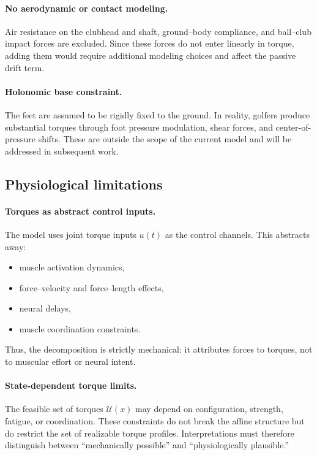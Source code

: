 \documentclass[12pt]{article}
\begin{document}
\paragraph{No aerodynamic or contact modeling.}
Air resistance on the clubhead and shaft, ground–body compliance, and ball–club impact forces are excluded. Since these forces do not enter linearly in torque, adding them would require additional modeling choices and affect the passive drift term.

\paragraph{Holonomic base constraint.}
The feet are assumed to be rigidly fixed to the ground. In reality, golfers produce substantial torques through foot pressure modulation, shear forces, and center-of-pressure shifts. These are outside the scope of the current model and will be addressed in subsequent work.

\subsection{Physiological limitations}

\paragraph{Torques as abstract control inputs.}
The model uses joint torque inputs \(u(t)\) as the control channels. This abstracts away:
\begin{itemize}
  \item muscle activation dynamics,
  \item force--velocity and force--length effects,
  \item neural delays,
  \item muscle coordination constraints.
\end{itemize}
Thus, the decomposition is strictly mechanical: it attributes forces to torques, not to muscular effort or neural intent.

\paragraph{State-dependent torque limits.}
The feasible set of torques \(\mathcal{U}(x)\) may depend on configuration, strength, fatigue, or coordination. These constraints do not break the affine structure but do restrict the set of realizable torque profiles. Interpretations must therefore distinguish between ``mechanically possible'' and ``physiologically plausible.''
\end{document}
